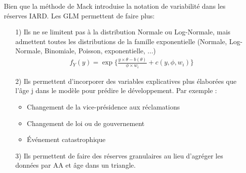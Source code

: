 Bien que la méthode de Mack introduise la notation de variabilité dans les réserves IARD. Les GLM permettent de faire plus:
\begin{itemize}
\item[1)] Ils ne se limitent pas à la distribution Normale ou Log-Normale, mais admettent toutes les distributions de la famille exponentielle (Normale, Log-Normale, Binomiale, Poisson, exponentielle, ...)
\begin{align*}
f_Y(y) = \exp \Big \lbrace \frac{y \times \theta - b(\theta)}{\phi \times w_i} + c(y, \phi, w_i) \Big\rbrace 
\end{align*}
\item[2)] Ils permettent d'incorporer des variables explicatives plus élaborées que l'âge j dans le modèle pour prédire le développement. Par exemple :
\begin{itemize}
\item Changement de la vice-présidence aux réclamations
\item Changement de loi ou de gouvernement
\item Événement catastrophique
\end{itemize}
\item[3)] Ils permettent de faire des réserves granulaires au lieu d'agréger les données par AA et âge dans un triangle.
\end{itemize}

